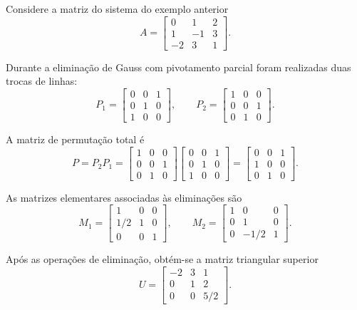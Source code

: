 \documentclass[../numerical_methods.tex]{subfiles}
\begin{document}
\begin{example}
	Considere a matriz do sistema do exemplo anterior
	\[
		A=
		\begin{bmatrix}
			0  & 1  & 2 \\
			1  & -1 & 3 \\
			-2 & 3  & 1
		\end{bmatrix}.
	\]

	Durante a eliminação de Gauss com pivotamento parcial foram realizadas duas trocas de linhas:
	\[
		P_1=
		\begin{bmatrix}
			0 & 0 & 1 \\
			0 & 1 & 0 \\
			1 & 0 & 0
		\end{bmatrix},
		\qquad
		P_2=
		\begin{bmatrix}
			1 & 0 & 0 \\
			0 & 0 & 1 \\
			0 & 1 & 0
		\end{bmatrix}.
	\]

	A matriz de permutação total é
	\[
		P=P_2P_1=
		\begin{bmatrix}
			1 & 0 & 0 \\
			0 & 0 & 1 \\
			0 & 1 & 0
		\end{bmatrix}
		\begin{bmatrix}
			0 & 0 & 1 \\
			0 & 1 & 0 \\
			1 & 0 & 0
		\end{bmatrix}
		=
		\begin{bmatrix}
			0 & 0 & 1 \\
			1 & 0 & 0 \\
			0 & 1 & 0
		\end{bmatrix}.
	\]

	As matrizes elementares associadas às eliminações são
	\[
		M_1=
		\begin{bmatrix}
			1   & 0 & 0 \\
			1/2 & 1 & 0 \\
			0   & 0 & 1
		\end{bmatrix},
		\qquad
		M_2=
		\begin{bmatrix}
			1 & 0    & 0 \\
			0 & 1    & 0 \\
			0 & -1/2 & 1
		\end{bmatrix}.
	\]

	Após as operações de eliminação, obtém-se a matriz triangular superior
	\[
		U=
		\begin{bmatrix}
			-2 & 3 & 1   \\
			0  & 1 & 2   \\
			0  & 0 & 5/2
		\end{bmatrix}.
	\]


\end{example}
\end{document}
